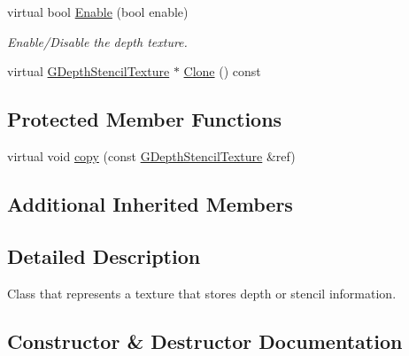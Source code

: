 \begin{DoxyCompactItemize}
\item 
\mbox{\label{class_geometry_engine_1_1_geometry_buffer_1_1_g_depth_stencil_texture_a38a1f3219bddbab69fa338a727e0ab3a}} 
virtual bool \mbox{\hyperlink{class_geometry_engine_1_1_geometry_buffer_1_1_g_depth_stencil_texture_a38a1f3219bddbab69fa338a727e0ab3a}{Enable}} (bool enable)
\begin{DoxyCompactList}\small\item\em Enable/\+Disable the depth texture. \end{DoxyCompactList}\item 
virtual \mbox{\hyperlink{class_geometry_engine_1_1_geometry_buffer_1_1_g_depth_stencil_texture}{G\+Depth\+Stencil\+Texture}} $\ast$ \mbox{\hyperlink{class_geometry_engine_1_1_geometry_buffer_1_1_g_depth_stencil_texture_ae831cf8a8610c82ae4b50622348b4e57}{Clone}} () const
\end{DoxyCompactItemize}
\subsection*{Protected Member Functions}
\begin{DoxyCompactItemize}
\item 
virtual void \mbox{\hyperlink{class_geometry_engine_1_1_geometry_buffer_1_1_g_depth_stencil_texture_a80ef1aeb049b89848d7855f53107a9f0}{copy}} (const \mbox{\hyperlink{class_geometry_engine_1_1_geometry_buffer_1_1_g_depth_stencil_texture}{G\+Depth\+Stencil\+Texture}} \&ref)
\end{DoxyCompactItemize}
\subsection*{Additional Inherited Members}


\subsection{Detailed Description}
Class that represents a texture that stores depth or stencil information. 

\subsection{Constructor \& Destructor Documentation}
\mbox{\label{class_geometry_engine_1_1_geometry_buffer_1_1_g_depth_stencil_texture_a2b0715430a2189c9fdce17ab836bbf25}} 
